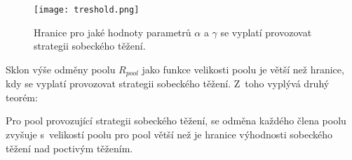 \begin{figure}[ht]
    \centering
    \texttt{[image: treshold.png]}
    \caption{Hranice pro jaké hodnoty parametrů $\alpha$ a $\gamma$ se vyplatí provozovat strategii sobeckého těžení.}
    \label{fig_treshold}
\end{figure}

Sklon výše odměny poolu $R_{pool}$ jako funkce velikosti poolu je větší než hranice, kdy se vyplatí provozovat strategii sobeckého těžení. Z~toho vyplývá druhý teorém:

\begin{theorem}
    Pro pool provozující strategii sobeckého těžení, se odměna každého člena poolu zvyšuje s~velikostí poolu pro pool větší než je hranice výhodnosti sobeckého těžení nad poctivým těžením.
\label{theorem_2}
\end{theorem}

